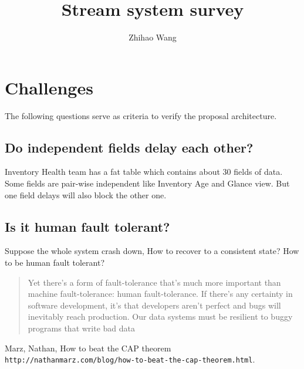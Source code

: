 \documentclass[12pt]{article}
\title{Stream system survey}
\author{Zhihao Wang}
\begin{document}
\maketitle

\section{Challenges}
The following questions serve as criteria to verify the proposal architecture.

\subsection{Do independent fields delay each other?}
Inventory Health team has a fat table which contains about 30 fields of data. Some fields are pair-wise independent like Inventory Age and Glance view. But one field delays will also block the other one.

\subsection{Is it human fault tolerant?}
Suppose the whole system crash down, How to recover to a consistent state? How to be human fault tolerant?
\begin{quote}
Yet there's a form of fault-tolerance that's much more important than machine fault-tolerance: human fault-tolerance. If there's any certainty in software development, it's that developers aren't perfect and bugs will inevitably reach production. Our data systems must be resilient to buggy programs that write bad data \cite{latexcompanion}
\end{quote}

\begin{thebibliography}{9}
     Marz, Nathan, How to beat the CAP theorem \texttt{http://nathanmarz.com/blog/how-to-beat-the-cap-theorem.html}.
\end{thebibliography}
\end{document}
